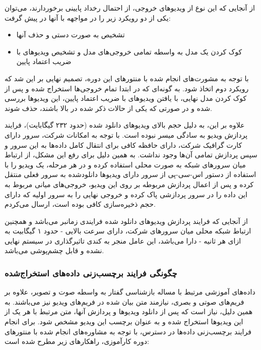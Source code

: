 از آنجایی که این نوع از ویدیو‌های خروجی، از احتمال رخداد پایینی برخوردارند، می‌توان یکی از دو رویکرد زیر را در مواجهه با آنها در پیش گرفت:

\begin{itemize}
	\item تشخیص به صورت دستی و حذف آنها
	\item کوک کردن یک مدل به واسطه تمامی خروجی‌های مدل و تشخیص ویدیو‌های با ضریب اعتماد پایین
\end{itemize}

با توجه به مشورت‌های انجام شده با منتور‌های این دوره، تصمیم نهایی بر این شد که رویکرد دوم اتخاذ شود. به گونه‌ای که در ابتدا تمام خروجی‌ها استخراج شده و پس از کوک کردن مدل نهایی، با یافتن ویدیو‌های با ضریب اعتماد پایین، این ویدیو‌ها بررسی شده و در صورتی که یکی از حالات ذکر شده در بالا باشند، حذف شوند.

علاوه بر این، به دلیل حجم بالای ویدیو‌های دانلود شده (حدود ۲۳۲ گیگابایت)، فرایند پردازش ویدیو به سادگی میسر نبوده است. با توجه به امکانات شرکت، سرور
دارای کارت گرافیک
شرکت، دارای حافظه کافی برای انتقال کامل داده‌ها به این سرور و سپس پردازش تمامی آن‌ها وجود نداشت. به همین دلیل برای رفع این مشکل، از ارتباط میان سرور‌های شبکه به صورت محلی استفاده کرده و در هر مرحله، یک ویدیو را با استفاده از دستور اس-سی-پی
از سرور دارای ویدیو‌ها دانلود‌شده به سرور فعلی منتقل کرده و پس از اعمال پردازش مربوطه بر روی این ویدیو، خروجی‌های میانی مربوط به این داده را در سرور پردازشی پاک کرده و خروجی نهایی را به سرور اولیه که دارای حجم ذخیره‌سازی کافی بوده است، ارسال می‌کردم. 

از آنجایی که فرایند پردازش ویدیو‌های دانلود شده فرایندی زمانبر می‌باشد و همچنین ارتباط شبکه محلی میان سرور‌های شرکت، دارای سرعت بالایی - حدود ۱ گیگابیت به ازای هر ثانیه - دارا می‌باشد، این عامل منجر به کندی تاثیر‌گذاری در سیستم نهایی نشده و قابل چشم‌پوشی می‌باشد.

\subsubsection{چگونگی فرایند برچسب‌زنی داده‌های استخراج‌شده}

داده‌های آموزشی مرتبط با مساله بازشناسی گفتار به واسطه صوت و تصویر، علاوه بر فریم‌های صوتی و بصری، نیازمند متن بیان شده در فریم‌های ویدیو نیز می‌باشند. به همین دلیل، نیاز است که پس از دانلود ویدیو‌ها و پردازش آنها، متن مرتبط با هر یک از این ویدیو‌ها استخراج شده و به عنوان برچسب این ویدیو مشخص شود. برای انجام فرایند برچسب‌زنی داده‌ها در دسترس، با توجه به مشاوره‌های انجام شده با منتور‌های دوره کارآموزی، راهکارهای زیر مطرح شده است:

